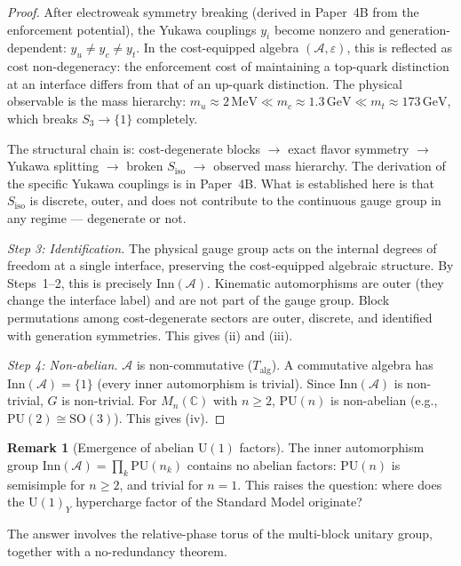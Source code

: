 \documentclass[11pt,a4paper]{article}
\theoremstyle{definition}
\newtheorem{remark}[theorem]{Remark}
\newcommand{\U}{\mathrm{U}}
\begin{document}
\begin{proof}
After electroweak symmetry breaking (derived in Paper~4B from the
enforcement potential), the Yukawa couplings $y_i$ become nonzero and
generation-dependent: $y_u \ne y_c \ne y_t$.  In the cost-equipped
algebra $(\mathcal{A}, \varepsilon)$, this is reflected as cost
non-degeneracy: the enforcement cost of maintaining a top-quark
distinction at an interface differs from that of an up-quark
distinction.  The physical observable is the mass hierarchy:
$m_u \approx 2\,\mathrm{MeV} \ll m_c \approx 1.3\,\mathrm{GeV}
\ll m_t \approx 173\,\mathrm{GeV}$, which breaks $S_3 \to \{1\}$
completely.

The structural chain is: cost-degenerate blocks $\to$ exact flavor
symmetry $\to$ Yukawa splitting $\to$ broken $S_{\mathrm{iso}}$ $\to$
observed mass hierarchy.  The derivation of the specific Yukawa
couplings is in Paper~4B.  What is established here is that
$S_{\mathrm{iso}}$ is discrete, outer, and does not contribute to the
continuous gauge group in any regime --- degenerate or not.

\textit{Step 3: Identification.}\quad
The physical gauge group acts on the internal degrees of freedom at a
single interface, preserving the cost-equipped algebraic structure.  By
Steps~1--2, this is precisely $\mathrm{Inn}(\mathcal{A})$.  Kinematic
automorphisms are outer (they change the interface label) and are not
part of the gauge group.  Block permutations among cost-degenerate
sectors are outer, discrete, and identified with generation symmetries.
This gives (ii) and (iii).

\textit{Step 4: Non-abelian.}\quad
$\mathcal{A}$ is non-commutative ($T_{\mathrm{alg}}$).  A commutative
algebra has $\mathrm{Inn}(\mathcal{A}) = \{1\}$ (every inner
automorphism is trivial).  Since $\mathrm{Inn}(\mathcal{A})$ is
non-trivial, $G$ is non-trivial.  For $M_n(\mathbb{C})$ with $n \ge 2$,
$\mathrm{PU}(n)$ is non-abelian (e.g., $\mathrm{PU}(2) \cong
\mathrm{SO}(3)$).  This gives (iv).
\end{proof}

\begin{remark}[Emergence of abelian $\U(1)$ factors]\label{rem:U1}
The inner automorphism group $\mathrm{Inn}(\mathcal{A}) = \prod_k
\mathrm{PU}(n_k)$ contains no abelian factors: $\mathrm{PU}(n)$ is
semisimple for $n \ge 2$, and trivial for $n = 1$.  This raises the
question: where does the $\U(1)_Y$ hypercharge factor of the Standard
Model originate?

The answer involves the relative-phase torus of the multi-block unitary
group, together with a no-redundancy theorem.
\end{remark}
\end{document}
